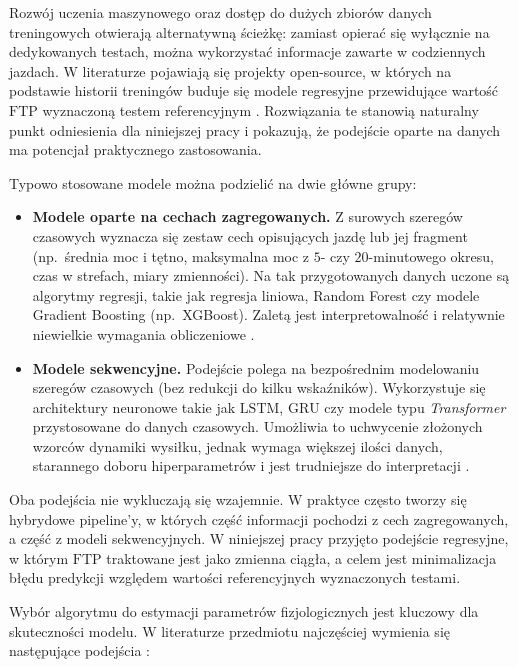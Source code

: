 Rozwój uczenia maszynowego oraz dostęp do dużych zbiorów danych treningowych otwierają alternatywną ścieżkę: zamiast opierać się wyłącznie na dedykowanych testach, można wykorzystać informacje zawarte w codziennych jazdach.
W literaturze pojawiają się projekty open-source, w których na podstawie historii treningów buduje się modele regresyjne przewidujące wartość $\mathrm{FTP}$ wyznaczoną testem referencyjnym \parencite{stockwell2023mlftp,denham2020predictftp}.
Rozwiązania te stanowią naturalny punkt odniesienia dla niniejszej pracy i pokazują, że podejście oparte na danych ma potencjał praktycznego zastosowania.

Typowo stosowane modele można podzielić na dwie główne grupy:
\begin{itemize}
  \item \textbf{Modele oparte na cechach zagregowanych.} Z surowych szeregów czasowych wyznacza się zestaw cech opisujących jazdę lub jej fragment (np.\ średnia moc i tętno, maksymalna moc z $5$- czy $20$-minutowego okresu, czas w strefach, miary zmienności). Na tak przygotowanych danych uczone są algorytmy regresji, takie jak regresja liniowa, Random Forest czy modele Gradient Boosting (np.\ XGBoost). Zaletą jest interpretowalność i relatywnie niewielkie wymagania obliczeniowe \parencite{stockwell2023mlftp}.
  \item \textbf{Modele sekwencyjne.} Podejście polega na bezpośrednim modelowaniu szeregów czasowych (bez redukcji do kilku wskaźników). Wykorzystuje się architektury neuronowe takie jak $\mathrm{LSTM}$, $\mathrm{GRU}$ czy modele typu \textit{Transformer} przystosowane do danych czasowych. Umożliwia to uchwycenie złożonych wzorców dynamiki wysiłku, jednak wymaga większej ilości danych, starannego doboru hiperparametrów i jest trudniejsze do interpretacji \parencite{stockwell2023mlftp}.
\end{itemize}

Oba podejścia nie wykluczają się wzajemnie.
W praktyce często tworzy się hybrydowe pipeline'y, w których część informacji pochodzi z cech zagregowanych, a część z modeli sekwencyjnych.
W niniejszej pracy przyjęto podejście regresyjne, w którym $\mathrm{FTP}$ traktowane jest jako zmienna ciągła, a celem jest minimalizacja błędu predykcji względem wartości referencyjnych wyznaczonych testami.

Wybór algorytmu do estymacji parametrów fizjologicznych jest kluczowy dla skuteczności modelu.
W literaturze przedmiotu najczęściej wymienia się następujące podejścia \parencite{stockwell2023mlftp}:


